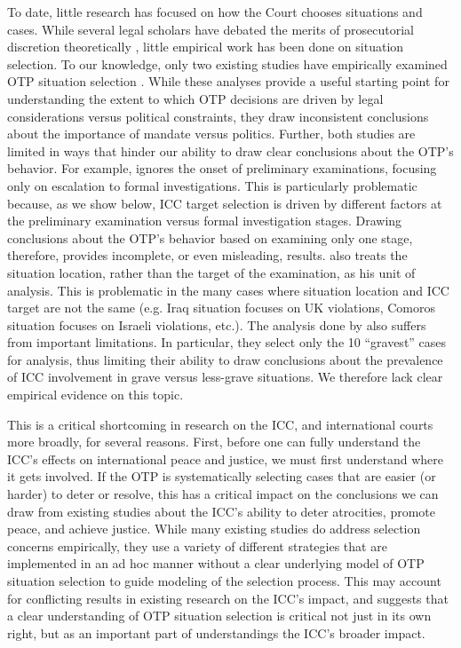 To date, little research has focused on how the Court chooses situations and cases. While several legal scholars have debated the merits of prosecutorial discretion theoretically \citep[e.g.,]{goldston2010more, sacouto2007gravity, schabas2008prosecutorial}, little empirical work has been done on situation selection. To our knowledge, only two existing studies have empirically examined OTP situation selection \citep{rudolph2017power, smeulers2015selection}. While these analyses provide a useful starting point for understanding the extent to which OTP decisions are driven by legal considerations versus political constraints, they draw inconsistent conclusions about the importance of mandate versus politics. Further, both studies are limited in ways that hinder our ability to draw clear conclusions about the OTP's behavior. For example, \citet{rudolph2017power} ignores the onset of preliminary examinations, focusing only on escalation to formal investigations. This is particularly problematic because, as we show below, ICC target selection is driven by different factors at the preliminary examination versus formal investigation stages. Drawing conclusions about the OTP's behavior based on examining only one stage, therefore, provides incomplete, or even misleading, results. \citet{rudolph2017power} also treats the situation location, rather than the target of the examination, as his unit of analysis. This is problematic in the many cases where situation location and ICC target are not the same (e.g. Iraq situation focuses on UK violations, Comoros situation focuses on Israeli violations, etc.). The analysis done by \citet{smeulers2015selection} also suffers from important limitations. In particular, they select only the 10 ``gravest'' cases for analysis, thus limiting their ability to draw conclusions about the prevalence of ICC involvement in grave versus less-grave situations. We therefore lack clear empirical evidence on this topic.

This is a critical shortcoming in research on the ICC, and international courts more broadly, for several reasons. First, before one can fully understand the ICC's effects on international peace and justice, we must first understand where it gets involved. If the OTP is systematically selecting cases that are easier (or harder) to deter or resolve, this has a critical impact on the conclusions we can draw from existing studies about the ICC's ability to deter atrocities, promote peace, and achieve justice. While many existing studies do address selection concerns empirically, they use a variety of different strategies that are implemented in an ad hoc manner without a clear underlying model of OTP situation selection to guide modeling of the selection process. This may account for conflicting results in existing research on the ICC's impact, and suggests that a clear understanding of OTP situation selection is critical not just in its own right, but as an important part of understandings the ICC's broader impact.

